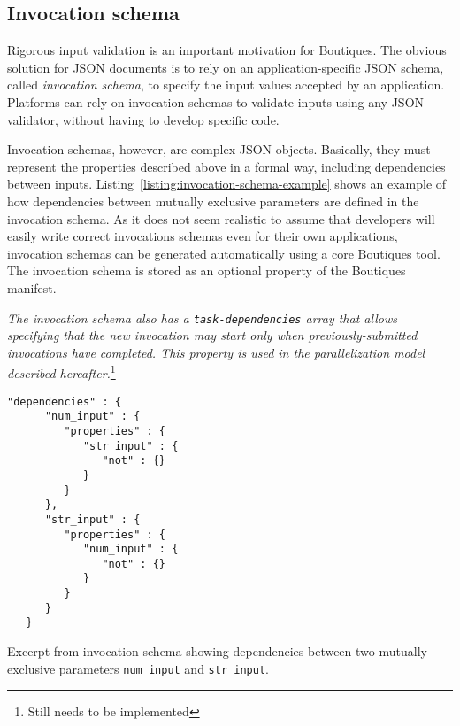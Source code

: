\documentclass{article}
\newcommand{\boutiques}{Boutiques\xspace}
\newcommand{\notimplementedyet}[1]{\color{blue}\emph{#1}\footnote{Still needs to be implemented}\color{black}\xspace}
\begin{document}
\subsection{Invocation schema}
\label{sec:invocation-schema}

Rigorous input validation is an important motivation for
\boutiques. The obvious solution for JSON documents is to rely on an
application-specific JSON schema, called \emph{invocation schema}, to
specify the input values accepted by an application. Platforms can
rely on invocation schemas to validate inputs using
any JSON validator, without having to develop specific code.

Invocation schemas, however, are complex JSON objects. Basically, they
must represent the properties described above in a formal way,
including dependencies between
inputs. Listing~\ref{listing:invocation-schema-example} shows an
example of how dependencies between mutually exclusive parameters are
defined in the invocation schema. As it does not seem realistic to
assume that developers will easily write correct invocations schemas
even for their own applications, invocation schemas can be generated
automatically using a core \boutiques tool. The invocation schema is
stored as an optional property of the Boutiques manifest.

\notimplementedyet{The invocation schema also has a
  \texttt{task-dependencies} array that allows specifying that the new
  invocation may start only when previously-submitted invocations have
  completed. This property is used in the parallelization model
  described hereafter.}

\begin{listing}
\begin{verbatim}
"dependencies" : {
      "num_input" : {
         "properties" : {
            "str_input" : {
               "not" : {}
            }
         }
      },
      "str_input" : {
         "properties" : {
            "num_input" : {
               "not" : {}
            }
         }
      }
   }
\end{verbatim}
\caption{Excerpt from invocation schema showing dependencies between
  two mutually exclusive parameters \texttt{num\_input} and
  \texttt{str\_input}.}
\label{listing:invocation-schema-example}
\end{listing}
\end{document}
